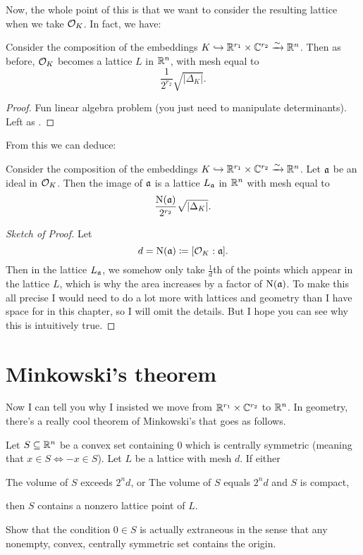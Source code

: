 Now, the whole point of this is that we want to consider the resulting lattice
when we take $\mathcal O_K$. In fact, we have:
\begin{lemma}
	\label{lem:vol_OK_mesh}
	Consider the composition of the embeddings $K \hookrightarrow \mathbb R^{r_1} \times \mathbb C^{r_2} \xrightarrow{\sim} \mathbb R^n$.
	Then as before, $\mathcal O_K$ becomes a lattice $L$ in $\mathbb R^n$, with mesh equal to
	\[ \frac{1}{2^{r_2}} \sqrt{\left\lvert \Delta_K \right\rvert}. \]
\end{lemma}
\begin{proof}
	Fun linear algebra problem (you just need to manipulate determinants).
	Left as .
\end{proof}
From this we can deduce:
\begin{lemma}
	Consider the composition of the embeddings $K \hookrightarrow \mathbb R^{r_1} \times \mathbb C^{r_2} \xrightarrow{\sim} \mathbb R^n$.
	Let $\mathfrak a$ be an ideal in $\mathcal O_K$.
	Then the image of $\mathfrak a$ is a lattice $L_\mathfrak a$ in $\mathbb R^n$ with mesh equal to
	\[ \frac{\operatorname{N}(\mathfrak a)}{2^{r_2}} \sqrt{\left\lvert \Delta_K \right\rvert}. \]
\end{lemma}
\begin{proof}[Sketch of Proof]
	Let \[ d = \operatorname{N}(\mathfrak a) \coloneqq [\mathcal O_K : \mathfrak a]. \]
	Then in the lattice $L_\mathfrak a$, we somehow only take $\frac 1d$th of the points
	which appear in the lattice $L$, which is why the area increases by a factor of $\operatorname{N}(\mathfrak a)$.
	To make this all precise I would need to do a lot more with lattices and geometry
	than I have space for in this chapter, so I will omit the details.
	But I hope you can see why this is intuitively true.
\end{proof}

\section{Minkowski's theorem}
Now I can tell you why I insisted we move from $\mathbb R^{r_1} \times \mathbb C^{r_2}$ to $\mathbb R^n$.
In geometry, there's a really cool theorem of Minkowski's that goes as follows.
\begin{theorem}
	[Minkowski]
	Let $S \subseteq \mathbb R^n$ be a convex set containing $0$
	which is centrally symmetric (meaning that $x \in S \iff -x \in S$).
	Let $L$ be a lattice with mesh $d$.
	If either
	\begin{enumerate}[(a)]
		\ii The volume of $S$ exceeds $2^n d$, or
		\ii The volume of $S$ equals $2^n d$ and $S$ is compact,
	\end{enumerate}
	then $S$ contains a nonzero lattice point of $L$.
\end{theorem}
\begin{ques}
	Show that the condition $0 \in S$ is actually extraneous
	in the sense that any nonempty, convex, centrally symmetric set contains the origin.
\end{ques}

